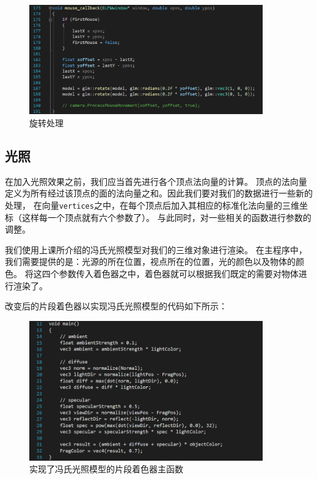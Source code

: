 \documentclass[UTF8]{ctexart}
\begin{document}
\begin{figure}[h]
	\centering
	\includegraphics*[width=0.9\textwidth]{5.png}
	\caption{旋转处理}
	\label{fig:5}
\end{figure}

\subsection{光照}
\par
在加入光照效果之前，我们应当首先进行各个顶点法向量的计算。
顶点的法向量定义为所有经过该顶点的面的法向量之和。因此我们要对我们的数据进行一些新的处理，
在向量\verb|vertices|之中，在每个顶点后加入其相应的标准化法向量的三维坐标（这样每一个顶点就有六个参数了）。
与此同时，对一些相关的函数进行参数的调整。
\par
我们使用上课所介绍的冯氏光照模型对我们的三维对象进行渲染。
在主程序中，我们需要提供的是：光源的所在位置，视点所在的位置，光的颜色以及物体的颜色。
将这四个参数传入着色器之中，着色器就可以根据我们既定的需要对物体进行渲染了。
\par
改变后的片段着色器以实现冯氏光照模型的代码如下所示：

\begin{figure}[h]
	\centering
	\includegraphics*[width=0.9\textwidth]{6.png}
	\caption{实现了冯氏光照模型的片段着色器主函数}
	\label{fig:6}
\end{figure}
\end{document}
